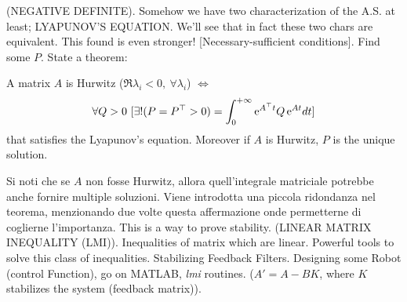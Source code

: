 (NEGATIVE DEFINITE). Somehow we have two characterization of the A.S. at least; LYAPUNOV'S EQUATION. We'll see that in fact these two chars are equivalent. This found is even stronger! [Necessary-sufficient conditions]. Find some $P$. State a theorem:

\begin{thrm}
A matrix $A$ is Hurwitz ($\Re{\lambda_i} < 0,\ \forall \lambda_i$) $\iff$
\[
	\forall Q > 0\ [\exists! (P=P^\top > 0) = \int_0^{+\infty}{\mathop{}\!\mathrm{e}^{A^\top t}Q\mathop{}\!\mathrm{e}^{At}dt}]
\]
that satisfies the Lyapunov's equation. Moreover if $A$ is Hurwitz, $P$ is the unique solution.
\end{thrm}

Si noti che se $A$ non fosse Hurwitz, allora quell'integrale matriciale potrebbe anche fornire multiple soluzioni. Viene introdotta una piccola ridondanza nel teorema, menzionando due volte questa affermazione onde permetterne di coglierne l'importanza.
This is a way to prove stability. (LINEAR MATRIX INEQUALITY (LMI)). Inequalities of matrix which are linear. Powerful tools to solve this class of inequalities. Stabilizing Feedback Filters. Designing some Robot (control Function), go on MATLAB, \emph{lmi} routines. ($A' = A - BK$, where $K$ stabilizes the system (feedback matrix)).

